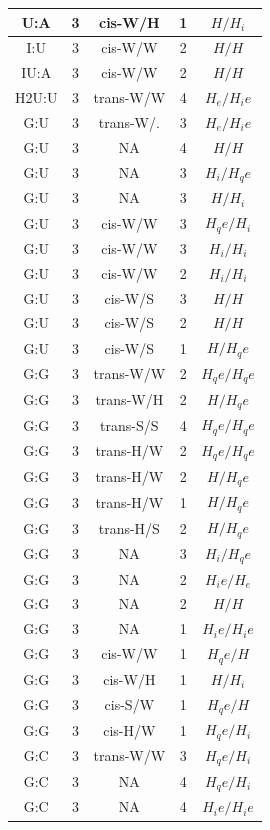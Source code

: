 \begin{center}
\begin{longtable}{c|c|c|c|c}
U:A & 3 & cis-W/H & 1 & $H/H_i$ \\  \hline
I:U & 3 & cis-W/W & 2 & $H/H$ \\  \hline
IU:A & 3 & cis-W/W & 2 & $H/H$ \\  \hline
H2U:U & 3 & trans-W/W & 4 & $H_e/H_ie$ \\  \hline
G:U & 3 & trans-W/. & 3 & $H_e/H_ie$ \\  \hline
G:U & 3 & NA & 4 & $H/H$ \\  \hline
G:U & 3 & NA & 3 & $H_i/H_qe$ \\  \hline
G:U & 3 & NA & 3 & $H/H_i$ \\  \hline
G:U & 3 & cis-W/W & 3 & $H_qe/H_i$ \\  \hline
G:U & 3 & cis-W/W & 3 & $H_i/H_i$ \\  \hline
G:U & 3 & cis-W/W & 2 & $H_i/H_i$ \\  \hline
G:U & 3 & cis-W/S & 3 & $H/H$ \\  \hline
G:U & 3 & cis-W/S & 2 & $H/H$ \\  \hline
G:U & 3 & cis-W/S & 1 & $H/H_qe$ \\  \hline
G:G & 3 & trans-W/W & 2 & $H_qe/H_qe$ \\  \hline
G:G & 3 & trans-W/H & 2 & $H/H_qe$ \\  \hline
G:G & 3 & trans-S/S & 4 & $H_qe/H_qe$ \\  \hline
G:G & 3 & trans-H/W & 2 & $H_qe/H_qe$ \\  \hline
G:G & 3 & trans-H/W & 2 & $H/H_qe$ \\  \hline
G:G & 3 & trans-H/W & 1 & $H/H_qe$ \\  \hline
G:G & 3 & trans-H/S & 2 & $H/H_qe$ \\  \hline
G:G & 3 & NA & 3 & $H_i/H_qe$ \\  \hline
G:G & 3 & NA & 2 & $H_ie/H_e$ \\  \hline
G:G & 3 & NA & 2 & $H/H$ \\  \hline
G:G & 3 & NA & 1 & $H_ie/H_ie$ \\  \hline
G:G & 3 & cis-W/W & 1 & $H_qe/H$ \\  \hline
G:G & 3 & cis-W/H & 1 & $H/H_i$ \\  \hline
G:G & 3 & cis-S/W & 1 & $H_qe/H$ \\  \hline
G:G & 3 & cis-H/W & 1 & $H_qe/H_i$ \\  \hline
G:C & 3 & trans-W/W & 3 & $H_qe/H_i$ \\  \hline
G:C & 3 & NA & 4 & $H_qe/H_i$ \\  \hline
G:C & 3 & NA & 4 & $H_ie/H_ie$ \\  \hline

\end{longtable}
\end{center}

